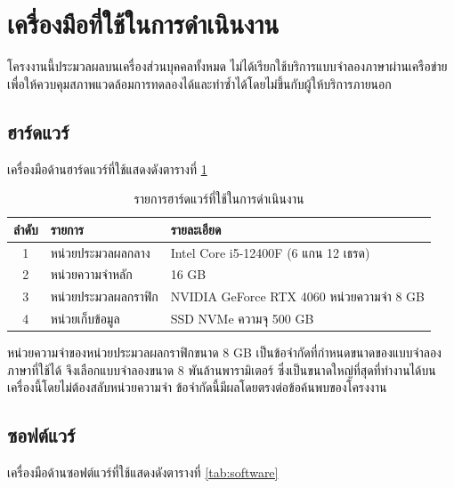 \section{เครื่องมือที่ใช้ในการดำเนินงาน}

โครงงานนี้ประมวลผลบนเครื่องส่วนบุคคลทั้งหมด ไม่ได้เรียกใช้บริการแบบจำลองภาษาผ่านเครือข่าย เพื่อให้ควบคุมสภาพแวดล้อมการทดลองได้และทำซ้ำได้โดยไม่ขึ้นกับผู้ให้บริการภายนอก

\subsection{ฮาร์ดแวร์}

เครื่องมือด้านฮาร์ดแวร์ที่ใช้แสดงดังตารางที่ \ref{tab:hardware}

\begin{table}[H]
\centering
\caption{รายการฮาร์ดแวร์ที่ใช้ในการดำเนินงาน}
\label{tab:hardware}
\begin{tabular}{|c|l|l|}
\hline
\textbf{ลำดับ} & \textbf{รายการ} & \textbf{รายละเอียด} \\
\hline
1 & หน่วยประมวลผลกลาง & Intel Core i5-12400F (6 แกน 12 เธรด) \\ \hline
2 & หน่วยความจำหลัก & 16 GB \\ \hline
3 & หน่วยประมวลผลกราฟิก & NVIDIA GeForce RTX 4060 หน่วยความจำ 8 GB \\ \hline
4 & หน่วยเก็บข้อมูล & SSD NVMe ความจุ 500 GB \\
\hline
\end{tabular}
\end{table}

หน่วยความจำของหน่วยประมวลผลกราฟิกขนาด 8 GB เป็นข้อจำกัดที่กำหนดขนาดของแบบจำลองภาษาที่ใช้ได้ จึงเลือกแบบจำลองขนาด 8 พันล้านพารามิเตอร์ ซึ่งเป็นขนาดใหญ่ที่สุดที่ทำงานได้บนเครื่องนี้โดยไม่ต้องสลับหน่วยความจำ ข้อจำกัดนี้มีผลโดยตรงต่อข้อค้นพบของโครงงาน

\subsection{ซอฟต์แวร์}

เครื่องมือด้านซอฟต์แวร์ที่ใช้แสดงดังตารางที่ \ref{tab:software}


